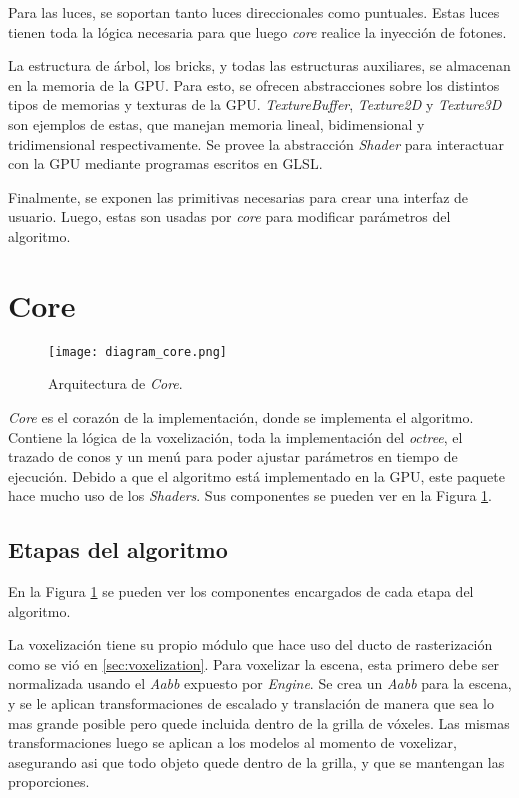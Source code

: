 Para las luces, se soportan tanto luces direccionales como puntuales.
Estas luces tienen toda la lógica necesaria para que luego \textit{core} realice la inyección de fotones.

La estructura de árbol, los bricks, y todas las estructuras auxiliares, se almacenan en la memoria de la GPU.
Para esto, se ofrecen abstracciones sobre los distintos tipos de memorias y texturas de la GPU.
\textit{TextureBuffer}, \textit{Texture2D} y \textit{Texture3D} son ejemplos de estas, que manejan memoria lineal, bidimensional y tridimensional respectivamente.
Se provee la abstracción \textit{Shader} para interactuar con la GPU mediante programas escritos en GLSL.

Finalmente, se exponen las primitivas necesarias para crear una interfaz de usuario.
Luego, estas son usadas por \textit{core} para modificar parámetros del algoritmo.

\section{Core}

\begin{figure}[ht]
    \centering
    \texttt{[image: diagram\_core.png]}
    \caption{Arquitectura de \textit{Core}.}
    \label{fig:core_architecture}
\end{figure}

\textit{Core} es el corazón de la implementación, donde se implementa el algoritmo.
Contiene la lógica de la voxelización, toda la implementación del \textit{octree}, el trazado de conos y un menú para poder ajustar parámetros en tiempo de ejecución.
Debido a que el algoritmo está implementado en la GPU, este paquete hace mucho uso de los \textit{Shaders}.
Sus componentes se pueden ver en la Figura \ref{fig:core_architecture}.

\subsection{Etapas del algoritmo}

En la Figura \ref{fig:core_architecture} se pueden ver los componentes encargados de cada etapa del algoritmo.

La voxelización tiene su propio módulo que hace uso del ducto de rasterización como se vió en \ref{sec:voxelization}.
Para voxelizar la escena, esta primero debe ser normalizada usando el \textit{Aabb} expuesto por \textit{Engine}.
Se crea un \textit{Aabb} para la escena, y se le aplican transformaciones de escalado y translación de manera que sea lo mas grande posible pero quede incluida dentro de la grilla de vóxeles.
Las mismas transformaciones luego se aplican a los modelos al momento de voxelizar, asegurando asi que todo objeto quede dentro de la grilla, y que se mantengan las proporciones.

